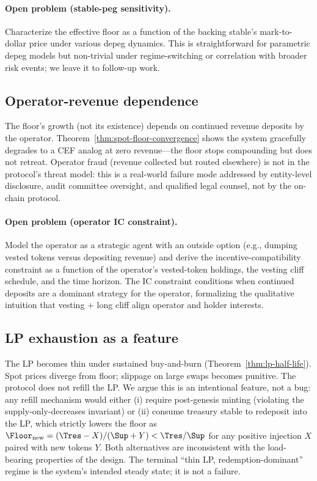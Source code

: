 \paragraph{Open problem (stable-peg sensitivity).} Characterize the effective floor as a function of the backing stable's mark-to-dollar price under various depeg dynamics. This is straightforward for parametric depeg models but non-trivial under regime-switching or correlation with broader risk events; we leave it to follow-up work.

\subsection{Operator-revenue dependence}
\label{sec:lim-operator}

The floor's growth (not its existence) depends on continued revenue deposits by the operator. Theorem~\ref{thm:spot-floor-convergence} shows the system gracefully degrades to a CEF analog at zero revenue---the floor stops compounding but does not retreat. Operator fraud (revenue collected but routed elsewhere) is not in the protocol's threat model: this is a real-world failure mode addressed by entity-level disclosure, audit committee oversight, and qualified legal counsel, not by the on-chain protocol.

\paragraph{Open problem (operator IC constraint).} Model the operator as a strategic agent with an outside option (e.g., dumping vested tokens versus depositing revenue) and derive the incentive-compatibility constraint as a function of the operator's vested-token holdings, the vesting cliff schedule, and the time horizon. The IC constraint conditions when continued deposits are a dominant strategy for the operator, formalizing the qualitative intuition that vesting + long cliff align operator and holder interests.

\subsection{LP exhaustion as a feature}
\label{sec:lim-lp}

The LP becomes thin under sustained buy-and-burn (Theorem~\ref{thm:lp-half-life}). Spot prices diverge from floor; slippage on large swaps becomes punitive. The protocol does not refill the LP. We argue this is an intentional feature, not a bug: any refill mechanism would either (i) require post-genesis minting (violating the supply-only-decreases invariant) or (ii) consume treasury stable to redeposit into the LP, which strictly lowers the floor as $\Floor_{\text{new}} = (\Tres - X)/(\Sup + Y) < \Tres/\Sup$ for any positive injection $X$ paired with new tokens $Y$. Both alternatives are inconsistent with the load-bearing properties of the design. The terminal ``thin LP, redemption-dominant'' regime is the system's intended steady state; it is not a failure.

